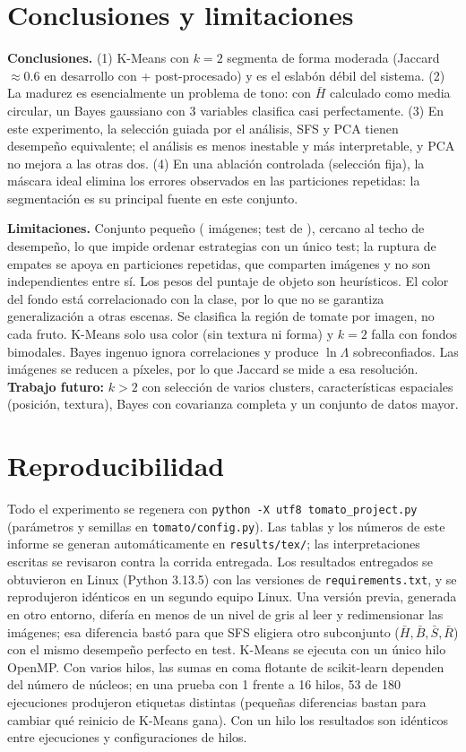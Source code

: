 \documentclass[11pt,a4paper]{article}
\begin{document}
\section{Conclusiones y limitaciones}

\textbf{Conclusiones.} (1) K-Means con $k=2$ segmenta de forma moderada
(Jaccard $\approx0.6$ en desarrollo con \BestCombo{} + post-procesado) y es el eslabón débil
del sistema. (2) La madurez es esencialmente un problema de tono: con $\bar H$ calculado como
media circular, un Bayes gaussiano con 3 variables clasifica casi perfectamente. (3) En este experimento, la selección guiada por el análisis, SFS y PCA tienen desempeño
equivalente; el análisis es menos inestable y más interpretable, y PCA no mejora a las otras
dos. (4) En una ablación controlada (selección fija), la máscara ideal elimina los errores
observados en las particiones repetidas: la segmentación es su principal fuente en este conjunto.

\textbf{Limitaciones.} Conjunto pequeño (\NImages{} imágenes; test de \NTest), cercano al techo
de desempeño, lo que impide ordenar estrategias con un único test; la ruptura de empates se
apoya en particiones repetidas, que comparten imágenes y no son independientes entre sí. Los
pesos del puntaje de objeto son heurísticos. El color del fondo está correlacionado con la
clase, por lo que no se garantiza generalización a otras escenas. Se clasifica la región de
tomate por imagen, no cada fruto. K-Means solo usa color (sin textura ni forma) y
$k=2$ falla con fondos bimodales. Bayes ingenuo ignora correlaciones y produce $\ln\Lambda$
sobreconfiados. Las imágenes se reducen a \MaxSide{} píxeles, por lo que Jaccard se mide a esa
resolución. \textbf{Trabajo futuro:} $k>2$ con selección de varios clusters, características
espaciales (posición, textura), Bayes con covarianza completa y un conjunto de datos mayor.

\section*{Reproducibilidad}

Todo el experimento se regenera con \texttt{python -X utf8 tomato\_project.py}
(parámetros y semillas en \texttt{tomato/config.py}). Las tablas y los números de este informe se generan
automáticamente en \texttt{results/tex/}; las interpretaciones escritas se revisaron contra la
corrida entregada. Los resultados entregados se obtuvieron en Linux (Python 3.13.5) con las versiones de
\texttt{requirements.txt}, y se reprodujeron idénticos en un segundo equipo Linux. Una versión
previa, generada en otro entorno, difería en menos de un nivel de gris al leer y redimensionar
las imágenes; esa diferencia bastó para que SFS eligiera otro subconjunto
($\bar H,\bar B,\bar S,\bar R$) con el mismo desempeño perfecto en test. K-Means se ejecuta con un único hilo OpenMP. Con varios
hilos, las sumas en coma flotante de scikit-learn dependen del número de núcleos; en una prueba
con 1 frente a 16 hilos, 53 de 180 ejecuciones produjeron etiquetas distintas (pequeñas
diferencias bastan para cambiar qué reinicio de K-Means gana). Con un hilo los resultados son
idénticos entre ejecuciones y configuraciones de hilos.
\end{document}
